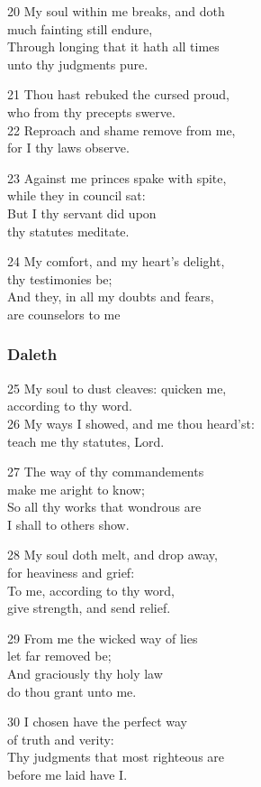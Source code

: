 20 My soul within me breaks, and doth\\
much fainting still endure,\\
Through longing that it hath all times\\
unto thy judgments pure.

21 Thou hast rebuked the cursed proud,\\
who from thy precepts swerve.\\
22 Reproach and shame remove from me,\\
for I thy laws observe.

23 Against me princes spake with spite,\\
while they in council sat:\\
But I thy servant did upon\\
thy statutes meditate.

24 My comfort, and my heart’s delight,\\
thy testimonies be;\\
And they, in all my doubts and fears,\\
are counselors to me

\subsubsection*{Daleth}

25 My soul to dust cleaves: quicken me,\\
according to thy word.\\
26 My ways I showed, and me thou heard’st:\\
teach me thy statutes, Lord.

27 The way of thy commandements\\
make me aright to know;\\
So all thy works that wondrous are\\
I shall to others show.

28 My soul doth melt, and drop away,\\
for heaviness and grief:\\
To me, according to thy word,\\
give strength, and send relief.

29 From me the wicked way of lies\\
let far removed be;\\
And graciously thy holy law\\
do thou grant unto me.

30 I chosen have the perfect way\\
of truth and verity:\\
Thy judgments that most righteous are\\
before me laid have I.

